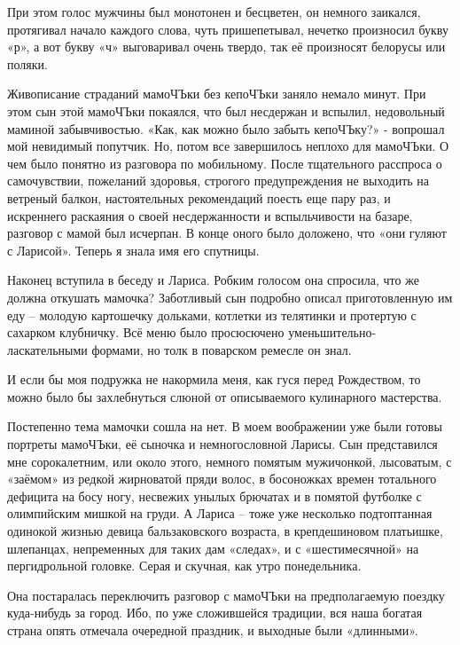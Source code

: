 При этом голос мужчины был монотонен и бесцветен, он немного заикался,
протягивал начало каждого слова, чуть пришепетывал, нечетко произносил букву
«р», а вот букву «ч» выговаривал очень твердо, так её произносят белорусы или
поляки.

Живописание страданий мамоЧЪки без кепоЧЪки заняло немало минут. При этом сын
этой мамоЧЪки покаялся, что был несдержан и вспылил, недовольный маминой
забывчивостью. «Как, как можно было забыть кепоЧЪку?» - вопрошал мой невидимый
попутчик. Но, потом все завершилось неплохо для мамоЧЪки. О чем было понятно из
разговора по мобильному. После тщательного расспроса о самочувствии, пожеланий
здоровья, строгого предупреждения не выходить на ветреный балкон, настоятельных
рекомендаций поесть еще пару раз, и искреннего раскаяния о своей несдержанности
и вспыльчивости на базаре, разговор с мамой был исчерпан. В конце оного было
доложено, что «они гуляют с Ларисой». Теперь я знала имя его спутницы.

Наконец вступила в беседу и Лариса. Робким голосом она спросила, что же должна
откушать мамочка? Заботливый сын подробно описал приготовленную им еду –
молодую картошечку дольками, котлетки из телятинки и протертую с сахарком
клубничку. Всё меню было просюсючено уменьшительно-ласкательными формами, но
толк в поварском ремесле он знал.

И если бы моя подружка не накормила меня, как гуся перед Рождеством, то можно
было бы захлебнуться слюной от описываемого кулинарного мастерства.

Постепенно тема мамочки сошла на нет. В моем воображении уже были готовы
портреты мамоЧЪки, её сыночка и немногословной Ларисы. Сын представился мне
сорокалетним, или около этого, немного помятым мужичонкой, лысоватым, с
«заёмом» из редкой жирноватой пряди волос, в босоножках времен тотального
дефицита на босу ногу, несвежих унылых брючатах и в помятой футболке с
олимпийским мишкой на груди. А Лариса – тоже уже несколько подтоптанная
одинокой жизнью девица бальзаковского возраста, в крепдешиновом платьишке,
шлепанцах, непременных для таких дам «следах», и с «шестимесячной» на
пергидрольной головке. Серая и скучная, как утро понедельника.


Она постаралась переключить разговор с мамоЧЪки на предполагаемую поездку
куда-нибудь за город. Ибо, по уже сложившейся традиции, вся наша богатая страна
опять отмечала очередной праздник, и выходные были «длинными».

